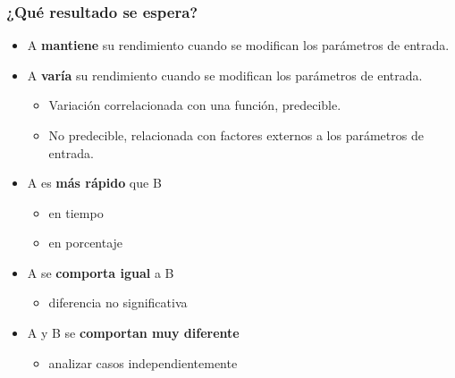 \documentclass[aspectratio=169]{beamer}
\begin{document}
\begin{frame}[fragile]
    \frametitle{ \vspace{-1cm} \flushright \colorbox{verdeuca}{ \small \textcolor{white}{ \footnotesize \secname } }\\
    ¿Qué resultado se espera?}
    \begin{itemize}
    \item \textcolor{blue!50}{A} \textbf{mantiene} su rendimiento cuando se modifican los parámetros de entrada.\pause
    \item \textcolor{blue!50}{A} \textbf{varía} su rendimiento cuando se modifican los parámetros de entrada.\pause
        \begin{itemize}
            \item Variación correlacionada con una función, predecible.
            \item No predecible, relacionada con factores externos a los parámetros de entrada.
        \end{itemize}\pause
    \item \textcolor{blue!50}{A} es \textbf{más rápido} que \textcolor{blue!50}{B}
        \begin{itemize}
            \item en tiempo
            \item en porcentaje
        \end{itemize}\pause
    \item \textcolor{blue!50}{A} se \textbf{comporta igual} a \textcolor{blue!50}{B}
        \begin{itemize}
            \item diferencia no significativa
        \end{itemize}\pause
    \item \textcolor{blue!50}{A} y \textcolor{blue!50}{B} se \textbf{comportan muy diferente}
        \begin{itemize}
            \item analizar casos independientemente
        \end{itemize}
    \end{itemize}
\end{frame}
\end{document}
